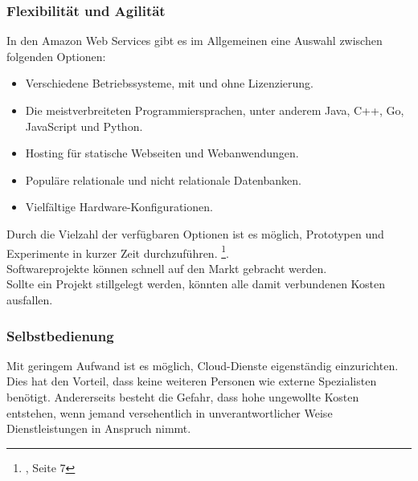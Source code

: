 \subsubsection{Flexibilität und Agilität}
In den Amazon Web Services gibt es im Allgemeinen eine Auswahl zwischen folgenden Optionen:
\begin{itemize}
      \item
            Verschiedene Betriebssysteme, mit und ohne Lizenzierung.
      \item
            Die meistverbreiteten Programmiersprachen, unter anderem Java, C++, Go, JavaScript und Python.{\cite{AMZ03}}

      \item
            Hosting für statische Webseiten und Webanwendungen.
            {\cite{AMZ04}}

      \item
            Populäre relationale und nicht relationale Datenbanken.
            {\cite{AMZ10}}
      \item
            Vielfältige Hardware-Konfigurationen.

\end{itemize}
\begin{flushleft}
      Durch die Vielzahl der verfügbaren Optionen ist es möglich, Prototypen und Experimente in kurzer Zeit durchzuführen.
      \footnote{{\cite{IDC01}}, Seite 7}.
      \\
      Softwareprojekte können schnell auf den Markt gebracht werden. 
      \\
      Sollte ein Projekt stillgelegt werden, könnten alle damit verbundenen Kosten ausfallen.
\end{flushleft}

\subsubsection{Selbstbedienung}
Mit geringem Aufwand ist es möglich, Cloud-Dienste eigenständig einzurichten. Dies hat den Vorteil, dass keine weiteren Personen wie externe Spezialisten benötigt. 
Andererseits besteht die Gefahr, dass hohe ungewollte Kosten entstehen, wenn jemand versehentlich in unverantwortlicher Weise Dienstleistungen in Anspruch nimmt. 

